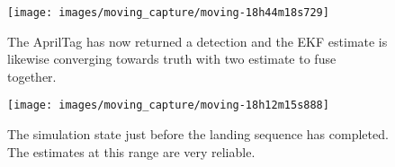 \begin{figure}
    \centering
    \texttt{[image: images/moving\_capture/moving-18h44m18s729]}
    \caption{The AprilTag has now returned a detection and the EKF estimate is likewise converging towards
    truth with two estimate to fuse together.}\label{f:tf_april}
\end{figure}

\begin{figure}
    \centering
    \texttt{[image: images/moving\_capture/moving-18h12m15s888]}
    \caption{The simulation state just before the landing sequence has completed. The estimates at this range
    are very reliable.}\label{f:tf_final}
\end{figure}


